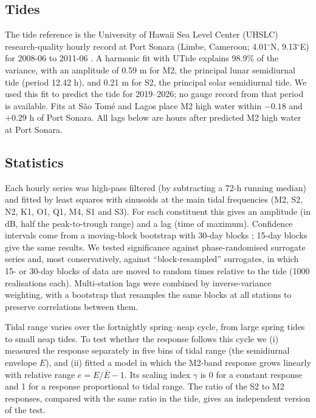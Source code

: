\documentclass[11pt]{article}
\newcommand{\degr}{\ensuremath{^\circ}}
\begin{document}
\subsection{Tides}
The tide reference is the University of Hawaii Sea Level Center (UHSLC) research-quality hourly record at Port Sonara (Limbe, Cameroon; 4.01\degr N, 9.13\degr E) for 2008-06 to 2011-06 \citep{uhslc}. A harmonic fit with UTide \citep{codiga2011,pawlowicz2002} explains 98.9\% of the variance, with an amplitude of 0.59 m for M2, the principal lunar semidiurnal tide (period 12.42 h), and 0.21 m for S2, the principal solar semidiurnal tide. We used this fit to predict the tide for 2019--2026; no gauge record from that period is available. Fits at S\~ao Tom\'e and Lagos place M2 high water within $-0.18$ and $+0.29$ h of Port Sonara. All lags below are hours after predicted M2 high water at Port Sonara.

\subsection{Statistics}
Each hourly series was high-pass filtered (by subtracting a 72-h running median) and fitted by least squares with sinusoids at the main tidal frequencies (M2, S2, N2, K1, O1, Q1, M4, S1 and S3). For each constituent this gives an amplitude (in dB, half the peak-to-trough range) and a lag (time of maximum). Confidence intervals come from a moving-block bootstrap with 30-day blocks \citep{kunsch1989}; 15-day blocks give the same results. We tested significance against phase-randomised surrogate series \citep{theiler1992} and, most conservatively, against ``block-resampled'' surrogates, in which 15- or 30-day blocks of data are moved to random times relative to the tide (1000 realisations each). Multi-station lags were combined by inverse-variance weighting, with a bootstrap that resamples the same blocks at all stations to preserve correlations between them.

Tidal range varies over the fortnightly spring--neap cycle, from large spring tides to small neap tides. To test whether the response follows this cycle we (i) measured the response separately in five bins of tidal range (the semidiurnal envelope $E$), and (ii) fitted a model in which the M2-band response grows linearly with relative range $e=E/\bar E-1$. Its scaling index $\gamma$ is 0 for a constant response and 1 for a response proportional to tidal range. The ratio of the S2 to M2 responses, compared with the same ratio in the tide, gives an independent version of the test.
\end{document}
